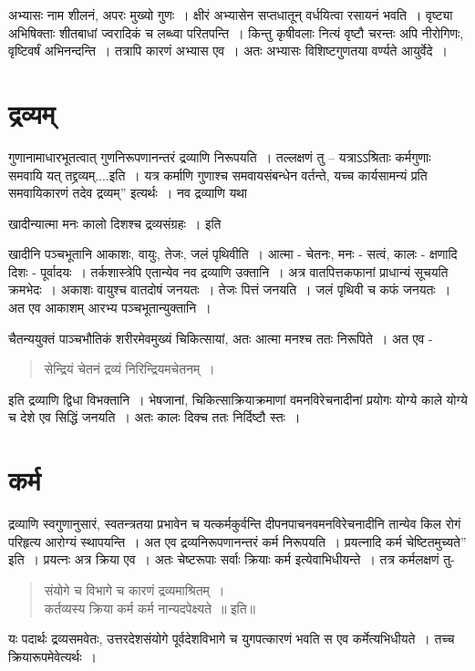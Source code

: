 {अभ्यासः नाम शीलनं, अपरः मुख्यो गुणः~। क्षीरं अभ्यासेन सप्तधातून् वर्धयित्वा रसायनं भवति~। वृष्ट्या अभिषिक्ताः शीतबाधां ज्वरादिकं च लब्ध्वा परितपन्ति~। किन्तु कृषीवलाः नित्यं वृष्टौ चरन्तः अपि नीरोगिणः, वृष्टिवर्षं अभिनन्दन्ति~। तत्रापि कारणं अभ्यास एव~। अतः अभ्यासः विशिष्टगुणतया वर्ण्यते आयुर्वेदे~। 

\section*{द्रव्यम्}

गुणानामाधारभूतत्वात् गुणनिरूपणानन्तरं द्रव्याणि निरूपयति~। तल्लक्षणं तु –  यत्राऽऽश्रिताः कर्मगुणाः समवायि यत् तद्द्रव्यम्....इति~। यत्र कर्माणि गुणाश्च समवायसंबन्धेन वर्तन्ते, यच्च कार्यसामन्यं प्रति समवायिकारणं तदेव द्रव्यम्” इत्यर्थः~। नव द्रव्याणि यथा \

खादीन्यात्मा मनः कालो दिशश्च द्रव्यसंग्रहः~। इति

खादीनि पञ्चभूतानि  आकाशः, वायुः, तेजः, जलं पृथिवीति~। आत्मा - चेतनः, मनः - सत्वं, कालः - क्षणादि दिशः - पूर्वादयः~। तर्कशास्त्रेपि एतान्येव नव द्रव्याणि उक्तानि~। अत्र वातपित्तकफानां प्राधान्यं सूचयति क्रमभेदः~। अकाशः वायुश्च वातदोषं जनयतः~। तेजः पित्तं जनयति~। जलं पृथिवी च कफं जनयतः~। अत एव आकाशम् आरभ्य पञ्चभूतान्युक्तानि~। 

चैतन्ययुक्तं पाञ्चभौतिकं शरीरमेवमुख्यं चिकित्सायां, अतः आत्मा मनश्च ततः निरूपिते~। अत एव -
\begin{verse}
सेन्द्रियं चेतनं द्रव्यं निरिन्द्रियमचेतनम्~।
\end{verse}
इति द्रव्याणि द्विधा विभक्तानि~। भेषजानां, चिकित्साक्रियाक्रमाणां वमनविरेचनादीनां प्रयोगः योग्ये काले योग्ये च देशे एव सिद्धिं जनयति~। अतः कालः दिक्च ततः निर्दिष्टौ स्तः~। 

\section*{कर्म} 

द्रव्याणि स्वगुणानुसारं, स्वतन्त्रतया प्रभावेन च यत्कर्मकुर्वन्ति दीपनपाचनवमनविरेचनादीनि तान्येव किल रोगं परिहृत्य आरोग्यं स्थापयन्ति~। अत एव द्रव्यनिरूपणानन्तरं कर्म निरूपयति~। प्रयत्नादि कर्म चेष्टितमुच्यते” इति~। प्रयत्नः अत्र क्रिया एव~। अतः चेष्टरूपाः सर्वाः क्रियाः कर्म इत्येवाभिधीयन्ते~। तत्र कर्मलक्षणं तु-
\begin{verse}
संयोगे च विभागे च कारणं द्रव्यमाश्रितम्~। \\
कर्तव्यस्य क्रिया कर्म कर्म नान्यदपेक्ष्यते~॥ इति॥
\end{verse}
यः पदार्थः द्रव्यसमवेतः, उत्तरदेशसंयोगे पूर्वदेशविभागे च युगपत्कारणं भवति स एव कर्मेत्यभिधीयते~। तच्च क्रियारूपमेवेत्यर्थः~। 

}
